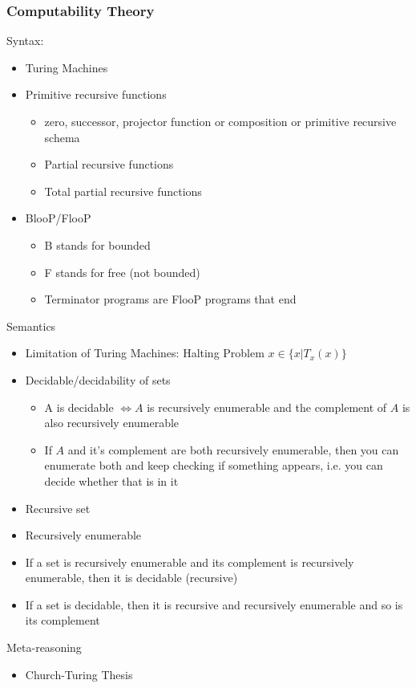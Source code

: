 \documentclass[11pt]{article}
\begin{document}
\subsubsection{Computability Theory}
\label{sec:orgbc44d04}
Syntax:
\begin{itemize}
\item Turing Machines
\item Primitive recursive functions
\begin{itemize}
\item zero, successor, projector function or composition or primitive recursive schema
\item Partial recursive functions
\item Total partial recursive functions
\end{itemize}
\item BlooP/FlooP
\begin{itemize}
\item B stands for bounded
\item F stands for free (not bounded)
\item Terminator programs are FlooP programs that end
\end{itemize}
\end{itemize}
Semantics
\begin{itemize}
\item Limitation of Turing Machines: Halting Problem \(x \in \{x | T_x(x)\}\)
\item Decidable/decidability of sets
\begin{itemize}
\item A is decidable \(\iff A\) is recursively enumerable and the complement of \(A\) is also recursively enumerable
\item If \(A\) and it's complement are both recursively enumerable, then you can enumerate both and keep checking if something appears, i.e. you can decide whether that is in it
\end{itemize}
\item Recursive set
\item Recursively enumerable
\item If a set is recursively enumerable and its complement is recursively enumerable, then it is decidable (recursive)
\item If a set is decidable, then it is recursive and recursively enumerable and so is its complement
\end{itemize}
Meta-reasoning
\begin{itemize}
\item Church-Turing Thesis
\end{itemize}
\end{document}

